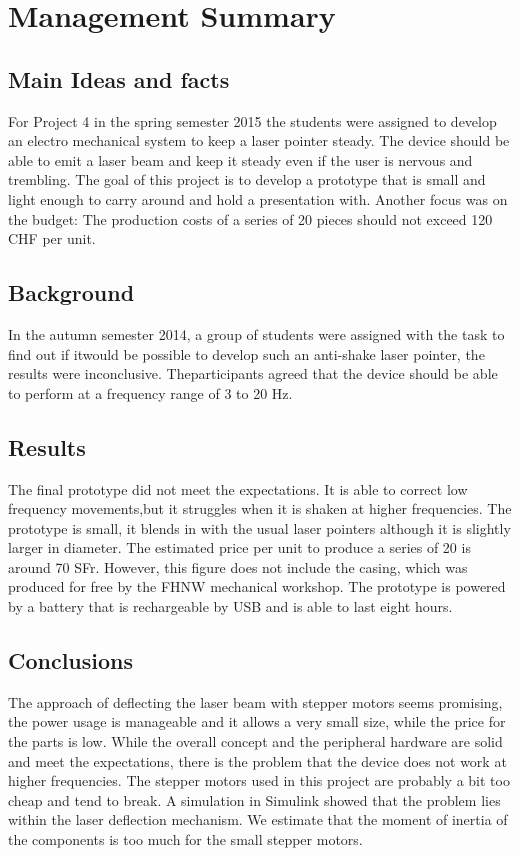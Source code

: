 \chapter*{Management Summary}
\label{chap:mgmtsum}

\section*{Main Ideas and facts}
For  Project 4  in the  spring  semester 2015  the students  were assigned  to
develop  an electro  mechanical system  to  keep a  laser pointer  steady. The
device should be able to emit a laser beam and keep it steady even if the user
is nervous and  trembling. The goal of this project is  to develop a prototype
that  is small  and  light enough  to  carry around  and  hold a  presentation
with. Another focus was on the budget: The  production costs of a series of 20
pieces should not exceed 120 CHF per unit.

\section*{Background}
In the autumn semester  2014, a group of students were  assigned with the task
to  find out  if  itwould be  possible  to develop  such  an anti-shake  laser
pointer, the results were inconclusive. Theparticipants agreed that the device
should be able to perform at a frequency range of 3 to 20 Hz.

\section*{Results}
The final prototype  did not meet the expectations. It is  able to correct low
frequency movements,but it struggles when  it is shaken at higher frequencies.
The prototype is small, it blends in with the usual laser pointers although it
is slightly  larger in  diameter. The estimated  price per  unit to  produce a
series  of 20  is around  70 SFr. However,  this figure  does not  include the
casing,  which was  produced for  free  by the  FHNW mechanical  workshop. The
prototype is powered by  a battery that is rechargeable by USB  and is able to
last eight hours.

\section*{Conclusions}
The approach of deflecting the laser beam with stepper motors seems promising,
the power usage is manageable and it allows a very small size, while the price
for the  parts is low. While the  overall concept and the  peripheral hardware
are solid and meet the expectations, there is the problem that the device does
not work at  higher frequencies.  The stepper motors used  in this project are
probably a  bit too cheap and  tend to break. A simulation  in Simulink showed
that the problem lies within  the laser deflection mechanism. We estimate that
the moment  of inertia  of the components  is too much  for the  small stepper
motors.

